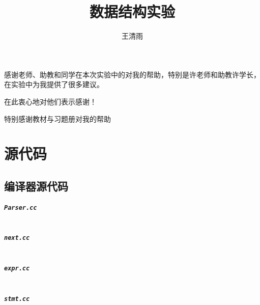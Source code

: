 \documentclass[format=draft,language=chinese,category=academic-report]{hustreport}
\title{数据结构实验}
\author{王清雨}
\begin{document}
\frontmatter
\maketitle
\tableofcontents

\mainmatter













\backmatter

\begin{ack}
	感谢老师、助教和同学在本次实验中的对我的帮助，特别是许老师和助教许学长，在实验中为我提供了很多建议。
	\par
	在此衷心地对他们表示感谢！
	\par
	特别感谢教材\cite{严蔚敏2002数据结构}与习题册\cite{严蔚敏1998数据结构题集}对我的帮助
\end{ack}



\appendix

\chapter{源代码}\label{ch:src}

\section{编译器源代码}

\paragraph{{\tt Parser.cc}}
\inputminted[linenos=true]{cpp}{../../src/project/Parser/Parser.cc}
\paragraph{{\tt next.cc}}
\inputminted[linenos=true]{cpp}{../../src/project/Parser/next.cc}
\paragraph{{\tt expr.cc}}
\inputminted[linenos=true]{cpp}{../../src/project/Parser/expr.cc}
\paragraph{{\tt stmt.cc}}
\inputminted[linenos=true]{cpp}{../../src/project/Parser/stmt.cc}
\end{document}
